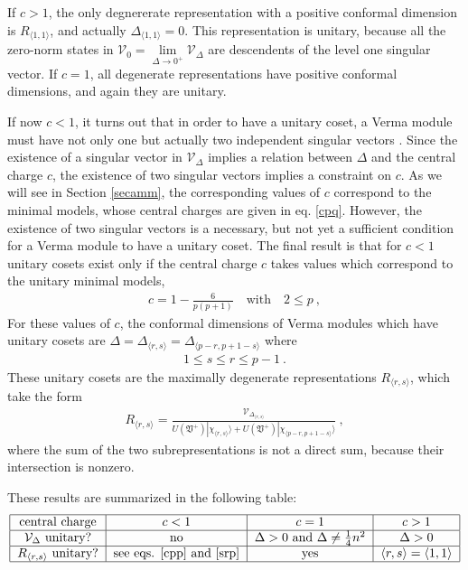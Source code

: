 \documentclass[12pt, a4paper, notitlepage, twoside]{report}
\numberwithin{equation}{section}
\theoremstyle{break}
\begin{document}
If $c > 1$, the only degnererate representation with a positive conformal dimension is $R_{\langle 1,1 \rangle}$, and actually $\Delta_{\langle 1,1 \rangle}=0$. This representation is unitary, because all the zero-norm states in $\mathcal{V}_0 = \underset{\Delta \to 0^+}{\lim} \mathcal{V}_\Delta$ are descendents of the level one singular vector. If $c=1$, all degenerate representations have positive conformal dimensions, and again they are unitary.

If now $c<1$, it turns out that in order to have a unitary coset, a Verma module must have not only one but actually two independent singular vectors \cite{fms97}. 
Since the existence of a singular vector in $\mathcal{V}_\Delta$ implies a relation between $\Delta$ and the central charge $c$, the existence of two singular vectors implies a constraint on $c$. 
As we will see in Section \ref{secamm}, the corresponding values of $c$ correspond to the minimal models, whose central charges are given in eq. \eqref{cpq}. 
However, the existence of two singular vectors is a necessary, but not yet a sufficient condition for a Verma module to have a unitary coset.
The final result is that for $c<1$ unitary cosets exist only if the central charge $c$ takes values which correspond to the unitary minimal models,
\begin{align}
 c = 1-\frac{6}{p(p+1)}  \quad \text{with} \quad 2\leq p\ ,
\label{cpp}
\end{align}
For these values of $c$,
the conformal dimensions of Verma modules which have unitary cosets are $\Delta=\Delta_{\langle r,s \rangle}=\Delta_{\langle p-r, p+1-s \rangle}$ where
\begin{align}
   1\leq s\leq r\leq p-1 \ .
\label{srp}
\end{align}
These unitary cosets are the maximally degenerate representations $R_{\langle r,s \rangle}$, which take the form
\begin{align}
 R_{\langle r,s \rangle} = \frac{\mathcal{V}_{\Delta_{\langle r,s \rangle}}}{U(\mathfrak{V}^+)|\chi_{\langle r,s \rangle}\rangle + U(\mathfrak{V}^+)|\chi_{\langle p-r,p+1-s \rangle}\rangle}\ ,
\label{rrs}
\end{align}
where the sum of the two subrepresentations is not a direct sum, because their intersection is nonzero. 

These results are summarized in the following table:
\begin{align}
 \begin{tabular}{|c|c|c|c|}
  \hline
central charge & $c<1$ & $c=1$ & $c>1$
\\
\hline
$\mathcal{V}_\Delta$ unitary? & no & $\Delta>0$ and $\Delta \neq \frac14 n^2$ & $\Delta>0$
\\
\hline
$R_{\langle r,s\rangle}$ unitary? & see eqs. \eqref{cpp} and \eqref{srp} &  yes & $\langle r,s \rangle = \langle 1,1\rangle$
\\
\hline
 \end{tabular}
\end{align}
\end{document}
